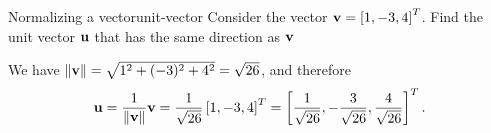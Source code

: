 \begin{example}{Normalizing a vector}{unit-vector}
  Consider the vector $\mbox{\bf v} = \left[1, -3, 4\right]^T$. Find the unit
  vector $\mbox{\bf u}$ that has the same direction as $\mbox{\bf v}$
\end{example}

\begin{solution}
  We have $\left\|\mbox{\bf v}\right\| = \sqrt{ 1^2 + (-3)^2 + 4^2} =
  \sqrt{26}$, and therefore
  \begin{equation*}
    \mbox{\bf u}
    = \frac{1}{\left\|\mbox{\bf v}\right\|} \mbox{\bf v}
    = \frac{1}{\sqrt{26}} \left[1, -3, 4\right]^T
    = \left[\frac{1}{\sqrt{26}}, -\frac{3}{\sqrt{26}}, \frac{4}{\sqrt{26}}\right]^T.
  \end{equation*}
\end{solution}

